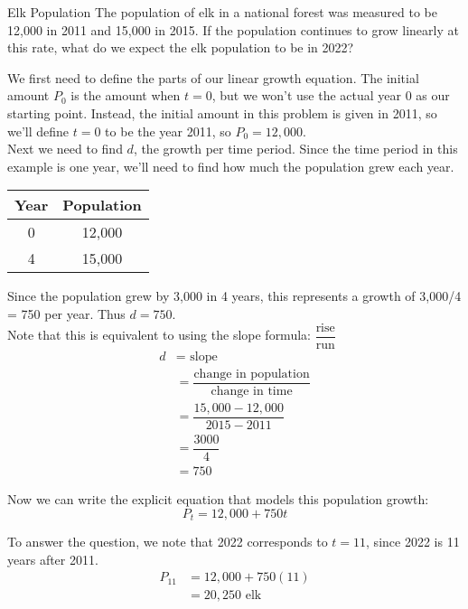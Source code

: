 \begin{example}[https://www.youtube.com/watch?v=cpaNK4jbMkA&list=PLfmpjsIzhztutjEb8Pg5OBOlI1p80yVoy&index=1]{Elk Population}
The population of elk in a national forest was measured to be 12,000 in 2011 and 15,000 in 2015.  If the population continues to grow linearly at this rate, what do we expect the elk population to be in 2022?

\solline
{}
We first need to define the parts of our linear growth equation.  The initial amount $P_0$ is the amount when $t=0$, but we won't use the actual year 0 as our starting point.  Instead, the initial amount in this problem is given in 2011, so we'll define $t=0$ to be the year 2011, so $P_0=12,000$.\\

Next we need to find $d$, the growth per time period.  Since the time period in this example is one year, we'll need to find how much the population grew each year.
\begin{center}
\begin{tabular}{c c}
\textbf{Year} & \textbf{Population}\\
\hline
0 & 12,000\\
4 & 15,000
\end{tabular}
\end{center}
Since the population grew by 3,000 in 4 years, this represents a growth of 3,000/4 = 750 per year.  Thus $d=750$.\\

Note that this is equivalent to using the slope formula: $\dfrac{\textrm{rise}}{\textrm{run}}$
\begin{align*}
d &= \textrm{ slope }\\
&= \dfrac{\textrm{change in population}}{\textrm{change in time}}\\
&= \dfrac{15,000 - 12,000}{2015 - 2011}\\
&= \dfrac{3000}{4}\\
&= 750
\end{align*}

Now we can write the explicit equation that models this population growth:
\[P_t = 12,000 + 750t\]

To answer the question, we note that 2022 corresponds to $t=11$, since 2022 is 11 years after 2011.
\begin{align*}
P_{11} &= 12,000 + 750(11)\\
&= \boxed{20,250 \textrm{ elk}}
\end{align*}
\end{example}

